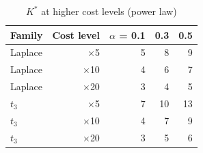 \begin{table}[htbp]
\centering
\caption{$K^*$ at higher cost levels (power law)}
\label{tab:a1b_kstar_cost}
\small
\begin{tabular}{lrrrr}
\toprule
Family & Cost level & $\alpha$ = 0.1 & 0.3 & 0.5 \\
\midrule
Laplace & $\times$5 & 5 & 8 & 9 \\
Laplace & $\times$10 & 4 & 6 & 7 \\
Laplace & $\times$20 & 3 & 4 & 5 \\
$t_3$ & $\times$5 & 7 & 10 & 13 \\
$t_3$ & $\times$10 & 4 & 7 & 9 \\
$t_3$ & $\times$20 & 3 & 5 & 6 \\
\bottomrule
\end{tabular}
\end{table}

